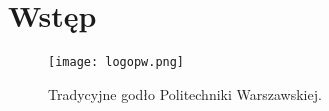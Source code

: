 \newpage %
\section[Wstęp]{Wstęp}
\lipsum[1] \cite{goossens93}
\begin{figure}[!h]
    \label{fig:anzelm}
    \centering \texttt{[image: logopw.png]}
    \caption{Tradycyjne godło Politechniki Warszawskiej.}
\end{figure}
\lipsum[2-10]
